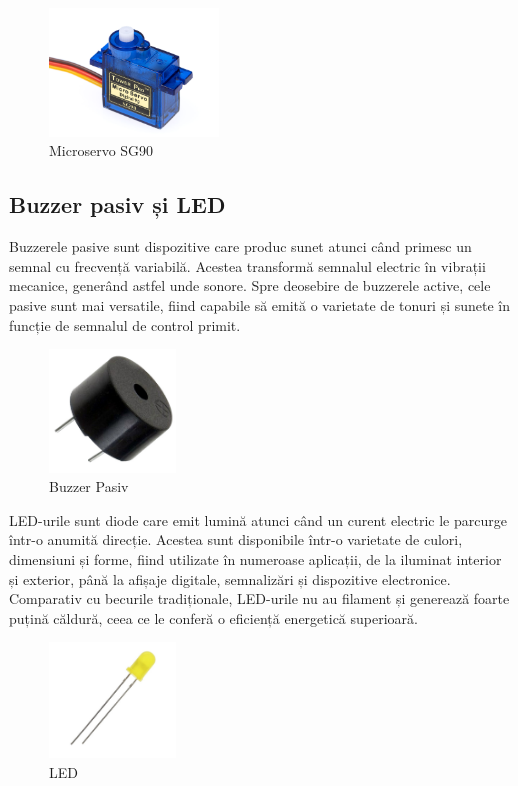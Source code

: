 \begin{figure}[H]
\includegraphics[width=0.4\textwidth, height=0.3\textwidth]{images/servo.png}
\caption{Microservo SG90\cite{servo_poza}}
\label{fig:servo}
\end{figure}

\subsection{Buzzer pasiv și LED}
Buzzerele pasive sunt dispozitive care produc sunet atunci când primesc un semnal cu frecvență variabilă. Acestea transformă semnalul electric în vibrații mecanice, generând astfel unde sonore. Spre deosebire de buzzerele active, cele pasive sunt mai versatile, fiind capabile să emită o varietate de tonuri și sunete în funcție de semnalul de control primit.

\begin{figure}[H]
\includegraphics[width=0.3\textwidth, height=0.3\textwidth]{images/buzzer.png}
\caption{Buzzer Pasiv\cite{buzzer_poza}}
\label{fig:buzzer}
\end{figure}

LED-urile sunt diode care emit lumină atunci când un curent electric le parcurge într-o anumită direcție. Acestea sunt disponibile într-o varietate de culori, dimensiuni și forme, fiind utilizate în numeroase aplicații, de la iluminat interior și exterior, până la afișaje digitale, semnalizări și dispozitive electronice. Comparativ cu becurile tradiționale, LED-urile nu au filament și generează foarte puțină căldură, ceea ce le conferă o eficiență energetică superioară.

\begin{figure}[H]
\includegraphics[width=0.3\textwidth, height=0.3\textwidth]{images/led.png}
\caption{LED\cite{led_poza}}
\label{fig:led}
\end{figure}

